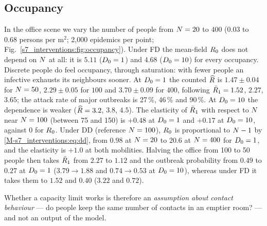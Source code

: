 \subsection{Occupancy}\label{s7_interventions:sec:occupancy}

In the office scene we vary the number of people from $N=20$ to $400$ (0.03 to 0.68 persons per m$^2$;
2,000 epidemics per point; Fig.~\ref{s7_interventions:fig:occupancy}).
 Under FD the mean-field $R_0$ does not
depend on $N$ at all: it is $5.11$ ($D_0=1$) and $4.68$ ($D_0=10$) for every occupancy. Discrete people do
feel occupancy, through saturation: with fewer people an infective exhausts its neighbours sooner. At $D_0=1$
the counted $\widehat{R}$ is $1.47\pm0.04$ for $N=50$, $2.29\pm0.05$ for $100$ and $3.70\pm0.09$ for $400$, following
$\bar{R}_1=1.52$, $2.27$, $3.65$; the attack rate of major outbreaks is 27\,\%, 46\,\% and 90\,\%. At $D_0=10$
the dependence is weaker ($\widehat{R}=3.2$, $3.8$, $4.5$). The elasticity of $\bar{R}_1$ with respect to $N$
near $N=100$ (between 75 and 150) is $+0.48$ at $D_0=1$ and $+0.17$ at $D_0=10$, against $0$ for $R_0$.
Under DD (reference $N=100$), $R_0$ is proportional to $N-1$ by \eqref{M-s7_interventions:eq:dd}, from
$0.98$ at $N=20$ to $20.6$ at $N=400$ for $D_0=1$, and the elasticity is $+1.0$ at both mobilities.
Halving the office from 100 to 50 people then takes $\bar{R}_1$ from $2.27$ to $1.12$ and the outbreak
probability from $0.49$ to $0.27$ at $D_0=1$ ($3.79\to1.88$ and $0.74\to0.53$ at $D_0=10$), whereas under FD it
takes them to $1.52$ and $0.40$ ($3.22$ and $0.72$).

Whether a capacity limit works is therefore an \emph{assumption about contact behaviour} --- do people keep
the same number of contacts in an emptier room? --- and not an output of the model.

